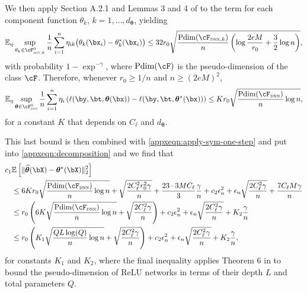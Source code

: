 \documentclass[12pt]{article}
\numberwithin{equation}{section}
\theoremstyle{definition}
\newcommand{\E}{\mathbb{E}}
\newcommand{\btheta}{\boldsymbol{\theta}}
\newcommand{\ttrue}{\theta^\star}
\newcommand{\bttrue}{\btheta^\star}
\newcommand{\bthat}{\bm{\widehat{\theta}}}
\newcommand{\dtheta}{d_{\btheta}}  %
\begin{document}
\begin{appendices}
We then apply Section A.2.1 and Lemmas 3 and 4 of \cite{Farrell-Liang-Misra2021_Ecma} to the term for each component function $\theta_k$, $k=1,\ldots,\dtheta$, yielding
\[
    \E_{\eta} \sup_{\theta_k \in \cF^0_{\textsc{dnn},k}} \frac{1}{n} \sum_{i=1}^n \eta_{ik} \big(\theta_k(\bx_i) - \ttrue_k(\bx_i) \big) \leq 32 r_0 \sqrt{\frac{{\rm Pdim}(\cF_{\textsc{dnn},k})}{n} \left( \log \frac{2eM}{r_0} + \frac{3}{2} \log n \right) } ,   
\]
with probability $1 - \exp^{-\gamma}$, where ${\rm Pdim}(\cF)$ is the pseudo-dimension of the class $\cF$. Therefore, whenever $r_0 \geq 1/n$ and $n \geq (2eM)^2$, 
\begin{equation*}
    \E_{\eta} \sup_{\btheta \in  \cF^0_{\textsc{dnn}} } \frac{1}{n}\sum_{i=1}^n \eta_i \left( \ell(\by,\bt,\btheta(\bx)) - \ell(\by,\bt,\bttrue(\bx)) \right) 
    \leq
    K r_0 \sqrt{ \frac{{\rm Pdim}(\cF_{\textsc{dnn}}) }{n}  \log n},
\end{equation*}
for a constant $K$ that depends on $C_\ell$ and $\dtheta$. 

This last bound is then combined with \eqref{appxeqn:apply-sym-one-step} and put into \eqref{appxeqn:decomposition} and we find that
\begin{align}
    c_1 & \E \left[ \|\bthat(\bX) - \bttrue (\bX) \|_2^2 \right]        \nonumber \\
    & \leq 6 K r_0 \sqrt{ \frac{{\rm Pdim}(\cF_{\textsc{dnn}}) }{n}  \log n}  + \sqrt{\frac{2 C_\ell^2 r_0^2 \gamma}{n}} + \frac{23 \cdot 3 M C_\ell}{3} \frac{\gamma}{n} + c_2 \epsilon_n^2 + \epsilon_n \sqrt{\frac{2C_\ell^2 \gamma }{n}} + \frac{7 C_\ell M \gamma}{n}         \nonumber \\
    & \leq r_0  \left( 6 K \sqrt{ \frac{{\rm Pdim}(\cF_{\textsc{dnn}}) }{n}  \log n}  + \sqrt{\frac{2 C_\ell^2 \gamma}{n}} \right) + c_2 \epsilon_n^2 + \epsilon_n \sqrt{\frac{2C_\ell^2 \gamma }{n}} + K_2 \frac{ \gamma}{n}         \nonumber \\
    & \leq r_0  \left( K_1 \sqrt{ \frac{ Q L \log(Q) }{n}  \log n}  + \sqrt{\frac{2 C_\ell^2 \gamma}{n}} \right) + c_2 \epsilon_n^2 + \epsilon_n \sqrt{\frac{2C_\ell^2 \gamma }{n}} + K_2 \frac{ \gamma}{n},         \label{appxeqn:something} 
\end{align}
for constants $K_1$ and $K_2$, where the final inequality applies Theorem 6 in \cite{Bartlett-etal2017_COLT} to bound the pseudo-dimension of ReLU networks in terms of their depth $L$ and total parameters $Q$.


\end{appendices}
\end{document}
